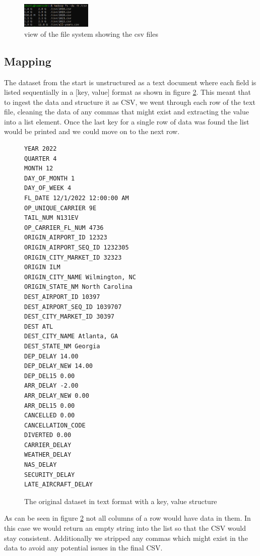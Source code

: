 \begin{figure}[H]
\centering
\includegraphics[width=0.30\textwidth]{fig/structured_dataset_size.png}
\caption{view of the file system showing the csv files}
\label{fig:CSV_Files}
\end{figure}


\subsection{Mapping}
The dataset from the start is unstructured as a text document where each field is listed sequentially in a [key, value] format as shown in figure \ref{fig:orig_text_data}. This meant that to ingest the data and structure it as CSV, we went through each row of the text file, cleaning the data of any commas that might exist and extracting the value into a list element. Once the last key for a single row of data was found the list would be printed and we could move on to the next row. \cite{hadoop}

\begin{figure}[H]
\centering
\begin{lstlisting}
YEAR 2022
QUARTER 4
MONTH 12
DAY_OF_MONTH 1
DAY_OF_WEEK 4
FL_DATE 12/1/2022 12:00:00 AM
OP_UNIQUE_CARRIER 9E
TAIL_NUM N131EV
OP_CARRIER_FL_NUM 4736
ORIGIN_AIRPORT_ID 12323
ORIGIN_AIRPORT_SEQ_ID 1232305
ORIGIN_CITY_MARKET_ID 32323
ORIGIN ILM
ORIGIN_CITY_NAME Wilmington, NC
ORIGIN_STATE_NM North Carolina
DEST_AIRPORT_ID 10397
DEST_AIRPORT_SEQ_ID 1039707
DEST_CITY_MARKET_ID 30397
DEST ATL
DEST_CITY_NAME Atlanta, GA
DEST_STATE_NM Georgia
DEP_DELAY 14.00
DEP_DELAY_NEW 14.00
DEP_DEL15 0.00
ARR_DELAY -2.00
ARR_DELAY_NEW 0.00
ARR_DEL15 0.00
CANCELLED 0.00
CANCELLATION_CODE 
DIVERTED 0.00
CARRIER_DELAY 
WEATHER_DELAY 
NAS_DELAY 
SECURITY_DELAY 
LATE_AIRCRAFT_DELAY 
\end{lstlisting}
\caption{The original dataset in text format with a key, value structure}
\label{fig:orig_text_data}
\end{figure}

As can be seen in figure \ref{fig:orig_text_data} not all columns of a row would have data in them. In this case we would return an empty string into the list so that the CSV would stay consistent. Additionally we stripped any commas which might exist in the data to avoid any potential issues in the final CSV.


